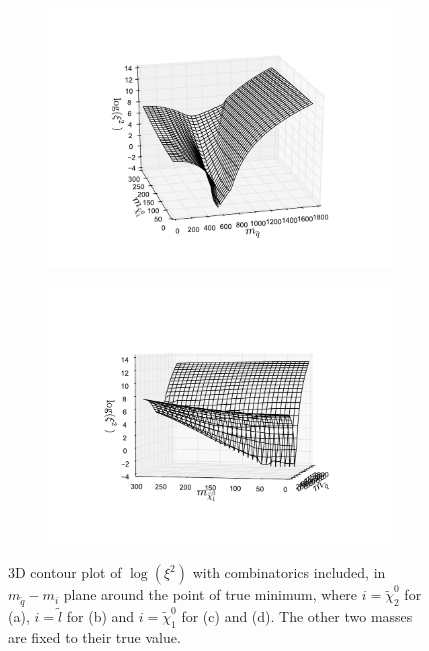 \documentclass[twoside,english]{uiofysmaster}
\begin{document}
\begin{figure}[hbt]
	\begin{subfigure}[b]{0.49\textwidth}
		\includegraphics[width=\textwidth]{figures/3D_plot_xisquared_25_herwig_events_with_combinatorics_squark-chi1.pdf} 
		\caption{}
		\label{fig:3D_masses_with_combinatorics3}
	\end{subfigure}
	\begin{subfigure}[b]{0.49\textwidth}
		\includegraphics[width=\textwidth]{figures/3D_plot_xisquared_25_herwig_events_with_combinatorics_squark-chi1_rotated.pdf} 
		\caption{}
		\label{fig:3D_masses_with_combinatorics4}
	\end{subfigure}
	\caption{3D contour plot of $\log(\xi^2)$ with combinatorics included, in $m_{\tilde q}-m_i$ plane around the point of true minimum, where $i=\tilde \chi_2^0$ for (a), $i=\tilde l$ for (b) and $i=\tilde \chi_1^0$ for (c) and (d). The other two masses are fixed to their true value.}
	\label{fig:3D_masses_with_combinatorics}
\end{figure}
\end{document}

